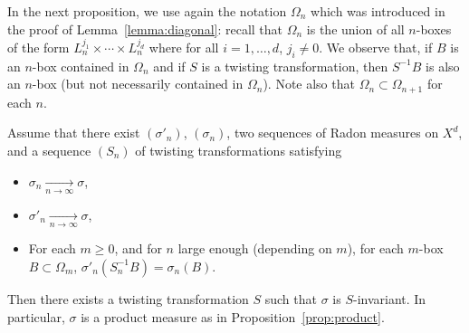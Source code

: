 \documentclass[AHL,Unicode,longabstracts]{cedram}
\newcommand{\tend}[3][]{\xrightarrow[#2\to#3]{#1}}
\newcommand{\ovC}{\Omega}
\begin{document}
In the next proposition, we use again the notation $\ovC_n$ which was introduced in the proof of Lemma~\ref{lemma:diagonal}: recall that $\ovC_n$ is the union of all $n$-boxes of the form $L_n^{j_1}\times\cdots\times L_n^{j_d}$ where for all $i=1,\ldots,d$, $j_i\neq0$. We observe that, if $B$ is an $n$-box contained in $\ovC_n$ and if $S$ is a twisting transformation, then $S^{-1}B$ is also an $n$-box (but not necessarily contained in $\ovC_n$). Note also that $\ovC_n\subset \ovC_{n+1}$ for each $n$.

\begin{prop}\label{prop:twist}
Assume that there exist $(\sigma'_n)$, $(\sigma_n)$, two sequences of Radon measures on $X^d$, and a sequence $(S_n)$ of twisting transformations satisfying
\begin{itemize}
\item $\sigma_n \tend{n}{\infty} \sigma$,
\item $\sigma'_n \tend{n}{\infty} \sigma$,
\item For each $m\ge0$, and for $n$ large enough (depending on $m$), for each $m$-box $B\subset\ovC_m$, $\sigma'_n(S_n^{-1}B)=\sigma_n(B)$.
\end{itemize}
Then there exists a twisting transformation $S$ such that $\sigma$ is $S$-invariant. In particular, $\sigma$ is a product measure as in Proposition~\ref{prop:product}.
\end{prop}
\end{document}
